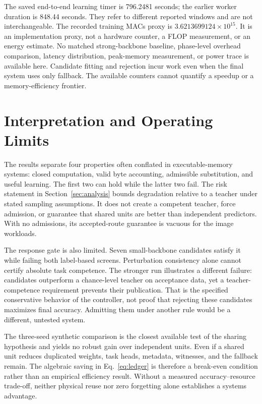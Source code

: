 \documentclass{article}
\begin{document}


The saved end-to-end learning timer is 796.2481 seconds; the earlier worker duration is 848.44 seconds. They refer to different reported windows and are not interchangeable. The recorded training MACs proxy is $3.6213699124\times10^{15}$. It is an implementation proxy, not a hardware counter, a FLOP measurement, or an energy estimate. No matched strong-backbone baseline, phase-level overhead comparison, latency distribution, peak-memory measurement, or power trace is available here. Candidate fitting and rejection incur work even when the final system uses only fallback. The available counters cannot quantify a speedup or a memory-efficiency frontier.

\section{Interpretation and Operating Limits}
The results separate four properties often conflated in executable-memory systems: closed computation, valid byte accounting, admissible substitution, and useful learning. The first two can hold while the latter two fail. The risk statement in Section~\ref{sec:analysis} bounds degradation relative to a teacher under stated sampling assumptions. It does not create a competent teacher, force admission, or guarantee that shared units are better than independent predictors. With no admissions, its accepted-route guarantee is vacuous for the image workloads.

The response gate is also limited. Seven small-backbone candidates satisfy it while failing both label-based screens. Perturbation consistency alone cannot certify absolute task competence. The stronger run illustrates a different failure: candidates outperform a chance-level teacher on acceptance data, yet a teacher-competence requirement prevents their publication. That is the specified conservative behavior of the controller, not proof that rejecting these candidates maximizes final accuracy. Admitting them under another rule would be a different, untested system.



The three-seed synthetic comparison is the closest available test of the sharing hypothesis and yields no robust gain over independent units. Even if a shared unit reduces duplicated weights, task heads, metadata, witnesses, and the fallback remain. The algebraic saving in Eq.~\eqref{eq:ledger} is therefore a break-even condition rather than an empirical efficiency result. Without a measured accuracy--resource trade-off, neither physical reuse nor zero forgetting alone establishes a systems advantage.
\end{document}

